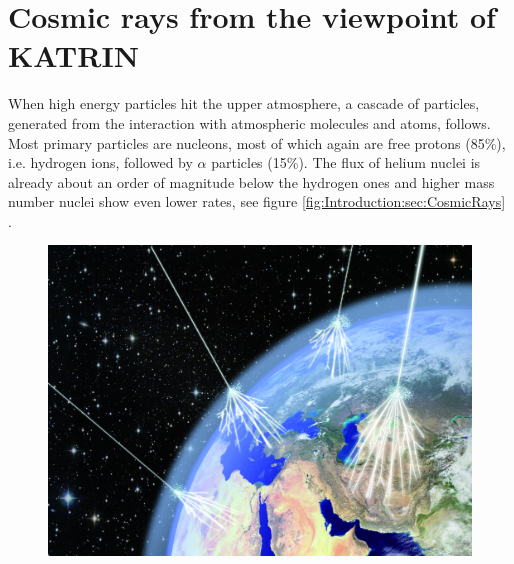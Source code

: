 	\section{Cosmic rays from the viewpoint of KATRIN}
    \label{ch:Introduction:sec:Cosmic Air Showers}
    When high energy particles hit the upper atmosphere, a cascade of particles, generated from the interaction with atmospheric molecules and atoms, follows. Most primary particles are nucleons, most of which again are free protons (85\%), i.e. hydrogen ions, followed by $\alpha$ particles (15\%). The flux of helium nuclei is already about an order of magnitude below the hydrogen ones and higher mass number nuclei show even lower rates, see figure \ref{fig:Introduction:sec:CosmicRays} \cite{highEnergyCosmicRays}.
    \begin{figure}
	\begin{minipage}[d]{0.49 \textwidth}
		  \includegraphics[width=\textwidth]{graphics/cosmicRays/cosmicRays.jpg}
	\end{minipage}
	\begin{minipage}[d]{0.49 \textwidth}

\end{minipage}
\end{figure}
